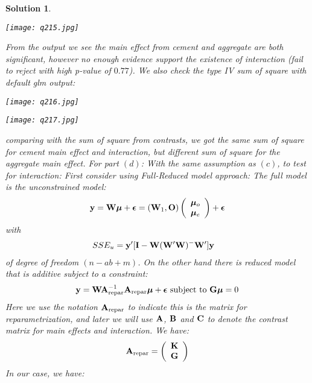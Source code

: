 \documentclass[11pt]{article}
\newtheorem{sol}{Solution}
\begin{document}
\begin{sol}
\begin{center}
		\texttt{[image: q215.jpg]}
	\end{center}
	From the output we see the main effect from cement and aggregate are both significant, however no enough evidence support the existence of interaction (fail to reject with high p-value of $0.77$).\vskip 2mm
	We also check the type IV sum of square with default glm output:
	\begin{center}
		\texttt{[image: q216.jpg]}
	\end{center}
	\begin{center}
		\texttt{[image: q217.jpg]}
	\end{center}
	comparing with the sum of square from contrasts, we got the same sum of square for cement main effect and interaction, but different sum of square for the aggregate main effect.\vskip 2mm
	For part $(d)$:\vskip 2mm
	With the same assumption as $(c)$, to test for interaction:\vskip 2mm
	First consider using Full-Reduced model approach:\vskip 2mm
	The full model is the unconstrained model:
	\begin{align*}
		{\bf y} = {\bf W}{\bm\mu} + {\bm\epsilon} = ({\bf W}_1, {\bf O})\left(\begin{array}{c} {\bm \mu}_{o}\\ {\bm\mu}_{e}\end{array}\right) + {\bm\epsilon}
	\end{align*}
	with 
	\begin{align*}
		SSE_u &= {\bf y}'[{\bf I} - {\bf W}({\bf W}'{\bf W})^-{\bf W}']{\bf y}
	\end{align*}
	of degree of freedom $(n - ab + m)$.\vskip 2mm
	On the other hand there is reduced model that is additive subject to a constraint:
	\begin{align*}
	{\bf y} = {\bf W}{\bf A}_{\text{repar}}^{-1}{\bf A}_{\text{repar}}{\bm\mu} + {\bm\epsilon} \text{ subject to } {\bf G}{\bm \mu} = 0
	\end{align*}
	Here we use the notation ${\bf A}_{\text{repar}}$ to indicate this is the matrix for reparametrization, and later we will use ${\bf A}$, ${\bf B}$ and ${\bf C}$ to denote the contrast matrix for main effects and interaction.\vskip 2mm
	We have:
	\begin{align*}
		{\bf A}_{\text{repar}}  = \left(\begin{array}{c} {\bf K}\\ {\bf G}\end{array}\right)
	\end{align*}
	In our case, we have:

\end{sol}
\end{document}
